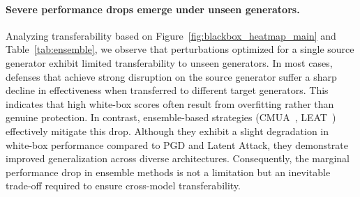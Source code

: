 \documentclass{article}
\begin{document}
\paragraph{Severe performance drops emerge under unseen generators.}
Analyzing transferability based on Figure~\ref{fig:blackbox_heatmap_main} and Table~\ref{tab:ensemble}, we observe that perturbations optimized for a single source generator exhibit limited transferability to unseen generators. In most cases, defenses that achieve strong disruption on the source generator suffer a sharp decline in effectiveness when transferred to different target generators. This indicates that high white-box scores often result from overfitting rather than genuine protection. In contrast, ensemble-based strategies (CMUA~\cite{huang2022cmua}, LEAT~\cite{shim2025leat}) effectively mitigate this drop. Although they exhibit a slight degradation in white-box performance compared to PGD and Latent Attack, they demonstrate improved generalization across diverse architectures. Consequently, the marginal performance drop in ensemble methods is not a limitation but an inevitable trade-off required to ensure cross-model transferability.
\end{document}
